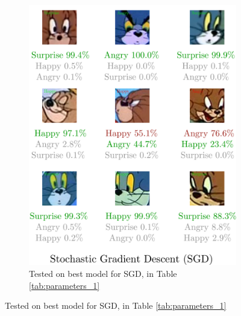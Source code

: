 \documentclass[report, 11pt, oneside]{dissertation}
\begin{document}
\begin{figure}[h]
	\unskip \vrule\
	\begin{subfigure}{0.5\textwidth}
		\includegraphics[scale=0.125]{figure_40.pdf}
		\caption{\tiny{Tested on best model for SGD, in Table \ref{tab:parameters_1}}}
	\end{subfigure}
	\label{fig:emotion_classification_sgd}
\end{figure}
\end{document}
